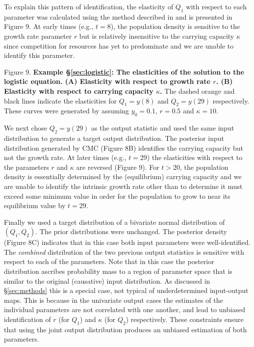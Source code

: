 \documentclass[10pt,letterpaper]{article}
\begin{document}
\vspace{0.5cm}

To explain this pattern of identification, the elasticity of $Q_1$ with respect to each parameter was calculated using the method described in \cite{DGCT2018} and is presented in Figure 9. At early times (e.g., $t=8$), the population density is sensitive to the growth rate parameter $r$ but is relatively insensitive to the carrying capacity $\kappa$ since competition for resources has yet to predominate and we are unable to identify this parameter.

\vspace{0.5cm}

Figure 9. {\bf Example \S \ref{sec:logistic}: The elasticities of the solution to the logistic equation. (A) Elasticity with respect to growth rate $r$. (B) Elasticity with respect to carrying capacity $\kappa$.} The dashed orange and black lines indicate the elasticities for $Q_1=y(8)$ and $Q_2=y(29)$ respectively. These curves were generated by assuming $y_0=0.1$, $r=0.5$ and $\kappa=10$.

\vspace{0.5cm}

We next chose $Q_2 = y(29)$ as the output  statistic and used the same input distribution to generate a target output distribution. The posterior input distribution generated by CMC (Figure 8B) identifies the carrying capacity but not the growth rate. At later times (e.g., $t=29$) the elasticities with respect to the parameters $r$ and $\kappa$ are reversed (Figure 9). For $t>20$, the population density is essentially determined by the (equilibrium) carrying capacity and we are unable to identify the intrinsic growth rate other than to determine it must exceed some minimum value in order for the population to grow to near its equilibrium value by $t=29$.

Finally we used a target distribution of a bivariate normal distribution of $(Q_1,Q_2)$. The prior distributions were unchanged. The posterior density (Figure 8C) indicates that in this case both input parameters were well-identified. The \emph{combined} distribution of the two previous output statistics is sensitive with respect to each of the parameters. Note that in this case the posterior distribution ascribes probability mass to a region of parameter space that is similar to the original (causative) input distribution. As discussed in \S \ref{sec:methods} this is a special case, not typical of underdetermined input-output maps. This is because in the univariate output cases the estimates of the individual parameters are not correlated with one another, and lead to unbiased identification of $r$ (for $Q_1$) and $\kappa$ (for $Q_2$) respectively. These constraints ensure that using the joint output distribution produces an unbiased estimation of both parameters.
\end{document}
